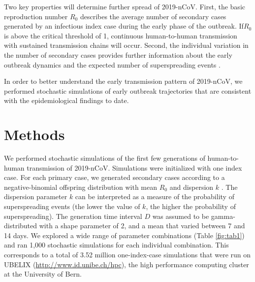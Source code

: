 \documentclass[a4]{article}
\begin{document}
Two key properties will determine further spread of 2019-nCoV. First, the basic reproduction number $R_0$ describes the average number of secondary cases generated by an infectious index case during the early phase of the outbreak. If$R_0$ is above the critical threshold of 1, continuous human-to-human transmission with sustained transmission chains will occur. Second, the individual variation in the number of secondary cases provides further information about the early outbreak dynamics and the expected number of superspreading events \cite{Lloyd-Smith:2005,Althaus:2015b,Kucharski:2015b}.

In order to better understand the early transmission pattern of 2019-nCoV, we performed stochastic simulations of early outbreak trajectories that are consistent with the epidemiological findings to date.
%
%
%
%

\section*{Methods}
We performed stochastic simulations of the first few generations of human-to-human transmission of 2019-nCoV. 
Simulations were initialized with one index case.
For each primary case, we generated secondary cases according to a negative-binomial offspring distribution with mean $R_0$ and dispersion $k$ \cite{Lloyd-Smith:2005,Althaus:2015b}.
The dispersion parameter $k$ can be interpreted as a measure of the probability of superspreading events (the lower the value of $k$, the higher the probability of superspreading).
The generation time interval $D$ was assumed to be gamma-distributed with a shape parameter of 2, and a mean that varied between 7 and 14 days.
We explored a wide range of parameter combinations (Table \ref{fig:tab1}) and ran 1,000 stochastic simulations for each individual combination. 
This corresponds to a total of 3.52 million one-index-case simulations that were run on UBELIX (\url{http://www.id.unibe.ch/hpc}), the high performance computing cluster at the University of Bern. 
\end{document}
